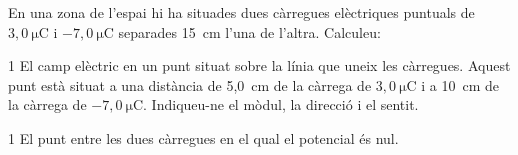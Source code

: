 En una zona de l'espai hi ha situades dues càrregues elèctriques puntuals de $3,0\ \mathrm{\mu C}$ i $-7,0\ \mathrm{\mu C}$ separades 15~cm l'una de l'altra. Calculeu:

\begin{apartat}{1}
El camp elèctric en un punt situat sobre la línia que uneix les càrregues. Aquest punt està situat a una distància de 5,0~cm de la càrrega de $3,0\ \mathrm{\mu C}$ i a 10~cm de la càrrega de $-7,0\ \mathrm{\mu C}$. Indiqueu-ne el mòdul, la direcció i el sentit.
\end{apartat}

\begin{apartat}{1}
El punt entre les dues càrregues en el qual el potencial és nul.
\end{apartat}

